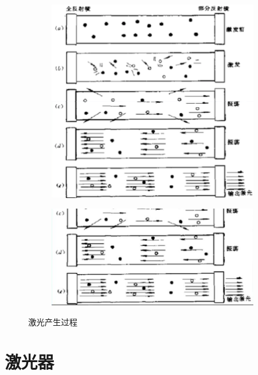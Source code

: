 \begin{figure}[!htbp]
	\centering
	\begin{subfigure}[t]{0.5\linewidth}
		\centering
		\includegraphics[width=\linewidth]{figure/Chapter2/激光的产生过程}
	\end{subfigure}
	\begin{subfigure}[t]{0.5\linewidth}
		\centering
		\includegraphics[width=\linewidth]{figure/Chapter2/激光的产生过程2}
	\end{subfigure}
	\caption{激光产生过程}
	\label{fig:Chpater2-激光产生过程}
\end{figure}

\section{激光器} %

